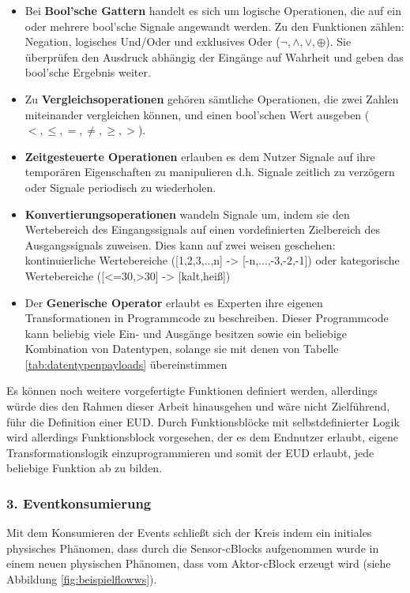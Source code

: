  \begin{itemize} 
     \item Bei \textbf{Bool'sche Gattern} handelt es sich um logische Operationen, die auf ein oder mehrere bool'sche Signale angewandt werden. Zu den Funktionen zählen: Negation, logisches Und/Oder und exklusives Oder ($\neg, \land, \lor, \oplus$). Sie überprüfen den Ausdruck abhängig der Eingänge auf Wahrheit und geben das bool'sche Ergebnis weiter.
     \item Zu \textbf{Vergleichsoperationen} gehören sämtliche Operationen, die zwei Zahlen miteinander vergleichen können, und einen bool'schen Wert ausgeben ($<,\leq,=,\neq,\geq,>$).
     \item \textbf{Zeitgesteuerte Operationen} erlauben es dem Nutzer Signale auf ihre temporären Eigenschaften zu manipulieren d.h. Signale zeitlich zu verzögern oder Signale periodisch zu wiederholen.
     \item \textbf{Konvertierungsoperationen} wandeln Signale um, indem sie den Wertebereich des Eingangssignals auf einen vordefinierten Zielbereich des Ausgangssignals zuweisen. Dies kann auf zwei weisen geschehen: kontinuierliche Wertebereiche ([1,2,3,..,n] -> [-n,...,-3,-2,-1]) oder kategorische Wertebereiche ([<=30,>30] -> [kalt,heiß])
     \item Der \textbf{Generische Operator} erlaubt es Experten ihre eigenen Transformationen in Programmcode zu beschreiben. Dieser Programmcode kann beliebig viele Ein- und Ausgänge besitzen sowie ein beliebige Kombination von Datentypen, solange sie mit denen von Tabelle \ref{tab:datentypenpayloads} übereinstimmen
 \end{itemize}
 Es können noch weitere vorgefertigte Funktionen definiert werden, allerdings würde dies den Rahmen dieser Arbeit hinausgehen und wäre nicht Zielführend, führ die Definition einer \ac{EUD}. Durch Funktionsblöcke mit selbstdefinierter Logik wird allerdings Funktionsblock vorgesehen, der es dem Endnutzer erlaubt, eigene Transformationslogik einzuprogrammieren und somit der \ac{EUD} erlaubt, jede beliebige Funktion ab zu bilden.
 
\subsubsection{3. Eventkonsumierung} \label{subsubsec:evebtkonsumierung}
Mit dem Konsumieren der Events schließt sich der Kreis indem ein initiales physisches Phänomen, dass durch die Sensor-cBlocks aufgenommen wurde in einem neuen physischen Phänomen, dass vom Aktor-cBlock erzeugt wird (siehe Abbildung \ref{fig:beispielflowws}). 

